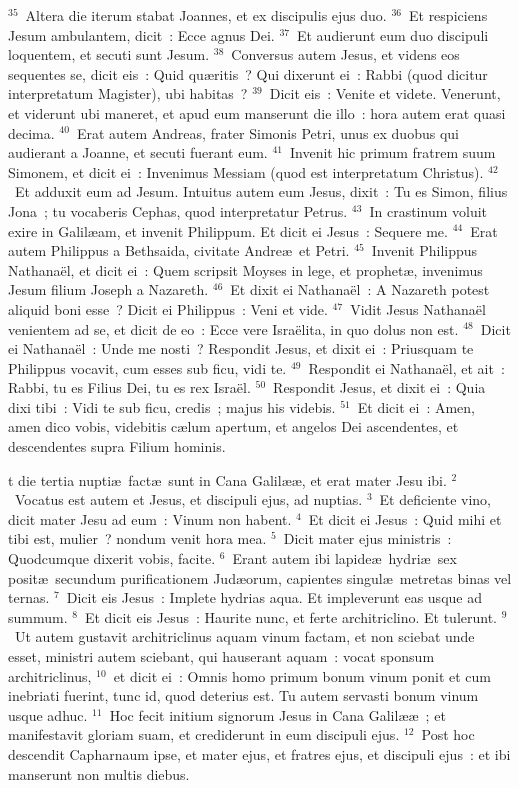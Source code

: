 ${}^{35}$~Altera die iterum stabat Joannes, et ex discipulis ejus duo.
${}^{36}$~Et respiciens Jesum ambulantem, dicit~: Ecce agnus Dei.
${}^{37}$~Et audierunt eum duo discipuli loquentem, et secuti sunt Jesum.
${}^{38}$~Conversus autem Jesus, et videns eos sequentes se, dicit eis~: Quid qu\ae ritis~? Qui dixerunt ei~: Rabbi (quod dicitur interpretatum Magister), ubi habitas~?
${}^{39}$~Dicit eis~: Venite et videte. Venerunt, et viderunt ubi maneret, et apud eum manserunt die illo~: hora autem erat quasi decima.
${}^{40}$~Erat autem Andreas, frater Simonis Petri, unus ex duobus qui audierant a Joanne, et secuti fuerant eum.
${}^{41}$~Invenit hic primum fratrem suum Simonem, et dicit ei~: Invenimus Messiam (quod est interpretatum Christus).
${}^{42}$~Et adduxit eum ad Jesum. Intuitus autem eum Jesus, dixit~: Tu es Simon, filius Jona~; tu vocaberis Cephas, quod interpretatur Petrus.
${}^{43}$~In crastinum voluit exire in Galil\ae am, et invenit Philippum. Et dicit ei Jesus~: Sequere me.
${}^{44}$~Erat autem Philippus a Bethsaida, civitate Andre\ae\ et Petri.
${}^{45}$~Invenit Philippus Nathana\"el, et dicit ei~: Quem scripsit Moyses in lege, et prophet\ae , invenimus Jesum filium Joseph a Nazareth.
${}^{46}$~Et dixit ei Nathana\"el~: A Nazareth potest aliquid boni esse~? Dicit ei Philippus~: Veni et vide.
${}^{47}$~Vidit Jesus Nathana\"el venientem ad se, et dicit de eo~: Ecce vere Isra\"elita, in quo dolus non est.
${}^{48}$~Dicit ei Nathana\"el~: Unde me nosti~? Respondit Jesus, et dixit ei~: Priusquam te Philippus vocavit, cum esses sub ficu, vidi te.
${}^{49}$~Respondit ei Nathana\"el, et ait~: Rabbi, tu es Filius Dei, tu es rex Isra\"el.
${}^{50}$~Respondit Jesus, et dixit ei~: Quia dixi tibi~: Vidi te sub ficu, credis~; majus his videbis.
${}^{51}$~Et dicit ei~: Amen, amen dico vobis, videbitis c\ae lum apertum, et angelos Dei ascendentes, et descendentes supra Filium hominis.

\bchapter
{}t die tertia nupti\ae\ fact\ae\ sunt in Cana Galil\ae \ae , et erat mater Jesu ibi.
${}^{2}$~Vocatus est autem et Jesus, et discipuli ejus, ad nuptias.
${}^{3}$~Et deficiente vino, dicit mater Jesu ad eum~: Vinum non habent.
${}^{4}$~Et dicit ei Jesus~: Quid mihi et tibi est, mulier~? nondum venit hora mea.
${}^{5}$~Dicit mater ejus ministris~: Quodcumque dixerit vobis, facite.
${}^{6}$~Erant autem ibi lapide\ae\ hydri\ae\ sex posit\ae\ secundum purificationem Jud\ae orum, capientes singul\ae\ metretas binas vel ternas.
${}^{7}$~Dicit eis Jesus~: Implete hydrias aqua. Et impleverunt eas usque ad summum.
${}^{8}$~Et dicit eis Jesus~: Haurite nunc, et ferte architriclino. Et tulerunt.
${}^{9}$~Ut autem gustavit architriclinus aquam vinum factam, et non sciebat unde esset, ministri autem sciebant, qui hauserant aquam~: vocat sponsum architriclinus,
${}^{10}$~et dicit ei~: Omnis homo primum bonum vinum ponit et cum inebriati fuerint, tunc id, quod deterius est. Tu autem servasti bonum vinum usque adhuc.
${}^{11}$~Hoc fecit initium signorum Jesus in Cana Galil\ae \ae~; et manifestavit gloriam suam, et crediderunt in eum discipuli ejus.
${}^{12}$~Post hoc descendit Capharnaum ipse, et mater ejus, et fratres ejus, et discipuli ejus~: et ibi manserunt non multis diebus.



